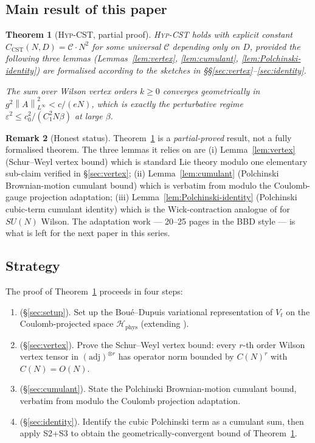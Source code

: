 \documentclass[11pt,a4paper]{amsart}
\newtheorem{theorem}{Theorem}[section]
\theoremstyle{definition}
\newtheorem{remark}[theorem]{Remark}
\newcommand{\norm}[1]{\left\lVert#1\right\rVert}
\newcommand{\HypCST}{\textsc{Hyp-CST}}
\begin{document}
\subsection{Main result of this paper}

\begin{theorem}[\HypCST{}, partial proof]\label{thm:main}
\HypCST{} holds with explicit constant $C_{\mathrm{CST}}(N, D) =
\mathcal C \cdot N^2$ for some universal $\mathcal C$ depending only
on $D$, provided the following three lemmas (Lemmas~\ref{lem:vertex},
\ref{lem:cumulant}, \ref{lem:Polchinski-identity}) are formalised
according to the sketches in \S\S\ref{sec:vertex}--\ref{sec:identity}.

The sum over Wilson vertex orders $k \geq 0$ converges geometrically
in $g^2 \norm{A}^2_{L^\infty} < c/(eN)$, which is exactly the
perturbative regime $\varepsilon^2 \leq c_0^2/(C_1^2 N\beta)$ at
large $\beta$.
\end{theorem}

\begin{remark}[Honest status]\label{rem:honest}
Theorem~\ref{thm:main} is a \emph{partial-proved} result, not a fully
formalised theorem. The three lemmas it relies on are (i) Lemma~\ref{lem:vertex}
(Schur--Weyl vertex bound) which is standard Lie theory modulo one
elementary sub-claim verified in \S\ref{sec:vertex}; (ii)
Lemma~\ref{lem:cumulant} (Polchinski Brownian-motion cumulant bound)
which is verbatim from \cite[\S 2.6]{BauerschmidtBodineauDagallier2024}
modulo the Coulomb-gauge projection adaptation; (iii)
Lemma~\ref{lem:Polchinski-identity} (Polchinski cubic-term cumulant
identity) which is the Wick-contraction analogue of
\cite[Lemma~3.7]{BauerschmidtDagallier2024} for $SU(N)$ Wilson. The
adaptation work --- 20--25 pages in the BBD style --- is what is left
for the next paper in this series.
\end{remark}

\subsection{Strategy}

The proof of Theorem~\ref{thm:main} proceeds in four steps:
\begin{enumerate}
\item[\textbf{S1}] (\S\ref{sec:setup}). Set up the Boué--Dupuis variational
representation of $V_t$ on the Coulomb-projected space $\mathcal
H_{\mathrm{phys}}$ (extending \cite[\S 2.5]{BauerschmidtBodineauDagallier2024}).
\item[\textbf{S2}] (\S\ref{sec:vertex}). Prove the Schur--Weyl vertex
bound: every $r$-th order Wilson vertex tensor in
$(\mathrm{adj})^{\otimes r}$ has operator norm bounded by $C(N)^r$
with $C(N) = O(N)$.
\item[\textbf{S3}] (\S\ref{sec:cumulant}). State the
Polchinski Brownian-motion cumulant bound, verbatim from
\cite{BauerschmidtBodineauDagallier2024} modulo the Coulomb projection
adaptation.
\item[\textbf{S4}] (\S\ref{sec:identity}). Identify the cubic
Polchinski term as a cumulant sum, then apply S2+S3 to obtain the
geometrically-convergent bound of Theorem~\ref{thm:main}.
\end{enumerate}
\end{document}
